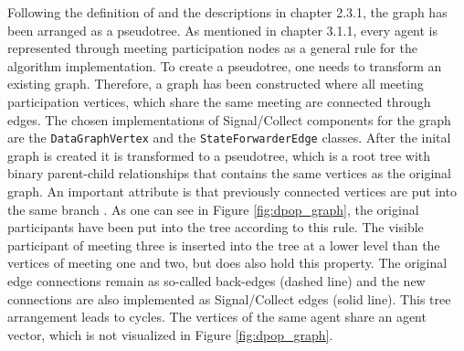 Following the definition of \cite{Petcu2003} and the descriptions in chapter 2.3.1, the graph has been arranged as a pseudotree. As mentioned in chapter 3.1.1, every agent is represented through meeting participation nodes as a general rule for the algorithm implementation. To create a pseudotree, one needs to transform an existing graph. Therefore, a graph has been constructed where all meeting participation vertices, which share the same meeting are connected through edges. The chosen implementations of Signal/Collect components for the graph are the \texttt{DataGraphVertex} and the \texttt{StateForwarderEdge} classes. After the inital graph is created it is transformed to a pseudotree, which is a root tree with binary parent-child relationships that contains the same vertices as the original graph. An important attribute is that previously connected vertices are put into the same branch \cite{Petcu2003}. As one can see in Figure \ref{fig:dpop_graph}, the original participants have been put into the tree according to this rule. The visible participant of meeting three is inserted into the tree at a lower level than the vertices of meeting one and two, but does also hold this property. The original edge connections remain as so-called back-edges (dashed line) and the new connections are also implemented as Signal/Collect edges (solid line). This tree arrangement leads to cycles. The vertices of the same agent share an agent vector, which is not visualized in Figure \ref{fig:dpop_graph}.

